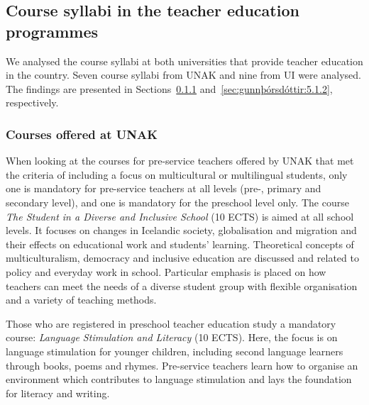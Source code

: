 \documentclass[output=paper]{langscibook}
\begin{document}
\subsection{Course syllabi in the teacher education programmes}\label{sec:gunnþórsdóttir:5.1} %

We analysed the course syllabi at both universities that provide teacher education in the country. Seven course syllabi from UNAK and nine from UI were analysed. The findings are presented in Sections~\ref{sec:gunnþórsdóttir:5.1.1} and~\ref{sec:gunnþórsdóttir:5.1.2}, respectively. 

\subsubsection{Courses offered at UNAK}\label{sec:gunnþórsdóttir:5.1.1} %

When looking at the courses for pre-service teachers offered by UNAK that met the criteria of including a focus on multicultural or multilingual students, only one is mandatory for pre-service teachers at all levels (pre-, primary and secondary level), and one is mandatory for the preschool level only. The course \textit{The Student in a Diverse and Inclusive School} (10 ECTS) is aimed at all school levels. It focuses on changes in Icelandic society, globalisation and migration and their effects on educational work and students’ learning. Theoretical concepts of multiculturalism, democracy and inclusive education are discussed and related to policy and everyday work in school. Particular emphasis is placed on how teachers can meet the needs of a diverse student group with flexible organisation and a variety of teaching methods.

\begin{sloppypar}
Those who are registered in preschool teacher education study a mandatory course: \textit{Language Stimulation and Literacy} (10 ECTS). Here, the focus is on language stimulation for younger children, including second language learners through books, poems and rhymes. Pre-service teachers learn how to organise an environment which contributes to language stimulation and lays the foundation for literacy and writing.
\end{sloppypar}
\end{document}
